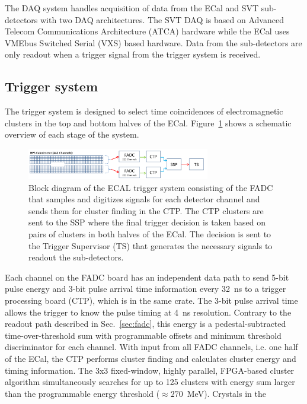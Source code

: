 \documentclass[final,3p,times,twocolumn]{elsarticle}
\begin{document}
The DAQ system handles acquisition of data from the ECal and SVT sub-detectors  with 
two DAQ architectures. The SVT DAQ is based on Advanced Telecom Communications Architecture 
(ATCA) hardware while the ECal uses VMEbus Switched Serial (VXS) based hardware. Data from the 
sub-detectors are only readout when a trigger signal from the trigger system is received.

\subsection{Trigger system}
\label{sec:trigger}
The trigger system is designed to select time coincidences of electromagnetic clusters in the 
top and bottom halves of the ECal. Figure~\ref{fig:hps_trigger_cal} shows a schematic overview 
of each stage of the system. 
 \begin{figure}[b]
\begin{center}
{\small
 \includegraphics[width=8cm]{figures/hps_trigger_cal}
\caption{Block diagram of the ECAL trigger system consisting of the FADC that samples and digitizes 
signals for each detector channel and sends them for cluster finding in the CTP. The CTP clusters are 
sent to the SSP where the final trigger decision is taken based on pairs of clusters in both halves of the 
ECal. The decision is sent to the Trigger Supervisor (TS) that generates the necessary signals to readout 
the sub-detectors.}
 \label{fig:hps_trigger_cal}
}
\end{center}
 \end{figure}
Each channel on the FADC board has an independent data path to send 5-bit pulse energy and 3-bit 
pulse arrival time information every 32~ns to a trigger processing board (CTP), which is in the same 
crate. The 3-bit pulse arrival time allows the trigger to know the pulse timing at 4~ns resolution. 
Contrary to the readout path 
described in Sec.~\ref{sec:fadc}, this energy is a pedestal-subtracted time-over-threshold sum with 
programmable offsets and minimum threshold discriminator for each channel. With input from all 
FADC channels, i.e. one half of the ECal, the CTP performs cluster finding and calculates cluster 
energy and timing information. The 3x3 fixed-window, highly parallel, FPGA-based cluster 
algorithm simultaneously searches for up to 125 clusters with energy sum larger than 
the programmable energy threshold ($\approx270$~MeV). Crystals in the 
\end{document}
